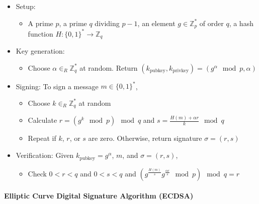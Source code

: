\documentclass[11pt]{article}
\begin{document}
\begin{itemize}
  \item Setup:
  \begin{itemize}
    \item A prime $p$, a prime $q$ dividing $p-1$, an element $g \in \mathbb{Z}_p^*$ of order $q$, a hash function $H: \{0,1\}^* \to \mathbb{Z}_q$
  \end{itemize}
  
  \item Key generation:
  \begin{itemize}
    \item Choose $\alpha \in_R \mathbb{Z}_q^*$ at random. Return $(k_{\text{pubkey}}, k_{\text{privkey}}) = (g^\alpha \mod p, \alpha)$
  \end{itemize}
  
  \item Signing: To sign a message $m \in \{0,1\}^*$,
  \begin{itemize}
    \item Choose $k \in_R \mathbb{Z}_q^*$ at random
    \item Calculate $r = (g^k \mod p) \mod q$ and $s = \frac{H(m) + \alpha r}{k} \mod q$
    \item Repeat if $k$, $r$, or $s$ are zero. Otherwise, return signature $\sigma = (r,s)$
  \end{itemize}
  
  \item Verification: Given $k_{\text{pubkey}} = g^\alpha$, $m$, and $\sigma = (r,s)$,
  \begin{itemize}
    \item Check $0 < r < q$ and $0 < s < q$ and $(g^{\frac{H(m)}{s}} g^{\frac{\alpha r}{s}} \mod p) \mod q = r$
  \end{itemize}
\end{itemize}

\paragraph{Elliptic Curve Digital Signature Algorithm (ECDSA)}
\end{document}
